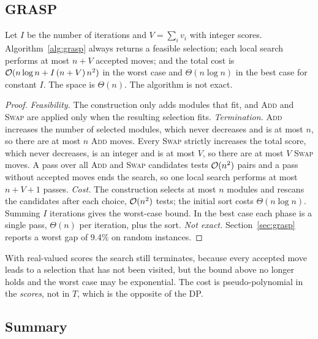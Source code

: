 \subsection{GRASP}\label{sec:complexity-grasp}

\begin{proposition}\label{prop:grasp}
Let $I$ be the number of iterations and $V=\sum_iv_i$ with integer scores. Algorithm~\ref{alg:grasp} always returns a feasible selection; each local search performs at most $n+V$ accepted moves; and the total cost is $\mathcal{O}(n\log n+I\,(n+V)\,n^2)$ in the worst case and $\Theta(n\log n)$ in the best case for constant $I$. The space is $\Theta(n)$. The algorithm is not exact.
\end{proposition}
\begin{proof}
\emph{Feasibility.} The construction only adds modules that fit, and \textsc{Add} and \textsc{Swap} are applied only when the resulting selection fits. \emph{Termination.} \textsc{Add} increases the number of selected modules, which never decreases and is at most $n$, so there are at most $n$ \textsc{Add} moves. Every \textsc{Swap} strictly increases the total score, which never decreases, is an integer and is at most $V$, so there are at most $V$ \textsc{Swap} moves. A pass over all \textsc{Add} and \textsc{Swap} candidates tests $\mathcal{O}(n^2)$ pairs and a pass without accepted moves ends the search, so one local search performs at most $n+V+1$ passes. \emph{Cost.} The construction selects at most $n$ modules and rescans the candidates after each choice, $\mathcal{O}(n^2)$ tests; the initial sort costs $\Theta(n\log n)$. Summing $I$ iterations gives the worst-case bound. In the best case each phase is a single pass, $\Theta(n)$ per iteration, plus the sort. \emph{Not exact.} Section~\ref{sec:grasp} reports a worst gap of 9.4\% on random instances.
\end{proof}

With real-valued scores the search still terminates, because every accepted move leads to a selection that has not been visited, but the bound above no longer holds and the worst case may be exponential. The cost is pseudo-polynomial in the \emph{scores}, not in $T$, which is the opposite of the DP.

\subsection{Summary}

